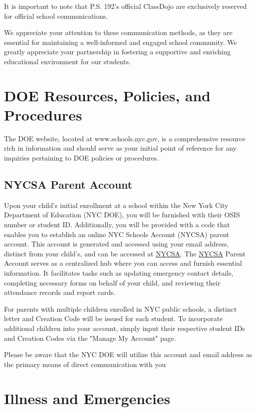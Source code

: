 \documentclass[11pt]{article}
\begin{document}
It is important to note that P.S. 192’s official ClassDojo are exclusively reserved for official school communications.

We appreciate your attention to these communication methods, as they are essential for maintaining a well-informed and engaged school community. We greatly appreciate your partnership in fostering a supportive and enriching educational environment for our students.

\section{DOE Resources, Policies, and Procedures}
\label{sec:org6977f97}
The DOE website, located at www.schools.nyc.gov, is a comprehensive resource rich in information and should serve as your initial point of reference for any inquiries pertaining to DOE policies or procedures.

\subsection{NYCSA Parent Account}
\label{sec:org47cd146}
Upon your child’s initial enrollment at a school within the New York City Department of Education (NYC DOE), you will be furnished with their OSIS number or student ID. Additionally, you will be provided with a code that enables you to establish an online NYC Schools Account (NYCSA) parent account. This account is generated and accessed using your email address, distinct from your child’s, and can be accessed at \href{https://www.schoolsaccount.nyc/}{NYCSA}. The  \href{https://www.schoolsaccount.nyc/}{NYCSA} Parent Account serves as a centralized hub where you can access and furnish essential information. It facilitates tasks such as updating emergency contact details, completing necessary forms on behalf of your child, and reviewing their attendance records and report cards.

For parents with multiple children enrolled in NYC public schools, a distinct letter and Creation Code will be issued for each student. To incorporate additional children into your account, simply input their respective student IDs and Creation Codes via the "Manage My Account" page.

Please be aware that the NYC DOE will utilize this account and email address as the primary means of direct communication with you

\section{Illness and Emergencies}
\label{sec:orgfa49159}
\end{document}
